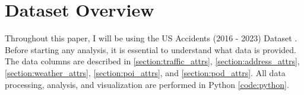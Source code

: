 \section{Dataset Overview}
Throughout this paper, I will be using the US Accidents (2016 - 2023) Dataset \citep{sobhanmoosavi_2023}. Before starting any analysis, it is essential to understand what data is provided. The data columns are described in \cref{section:traffic_attrs}, \cref{section:address_attrs}, \cref{section:weather_attrs}, \cref{section:poi_attrs}, and \cref{section:pod_attrs}. All data processing, analysis, and visualization are performed in Python \cref{code:python}.